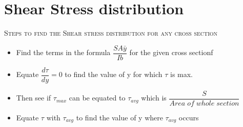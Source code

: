 \documentclass[8pt]{report}
\begin{document}
	\section{Shear Stress distribution}
	\textsc{Steps to find the Shear stress distribution for any cross section}
		\begin{itemize}
			\item Find the terms in the formula $\boxed{\dfrac{SA\bar{y}}{Ib}}$ for the given cross sectionf
			\item Equate $\dfrac{d\tau}{dy}=0$ to find the value of y for which $\tau$ is max.
			\item Then see if $\tau_{max}$ can be equated to $\tau_{avg}$ which is $\dfrac{S}{Area\;of\;whole\;section}$
			\item Equate $\tau$ with $\tau_{avg}$ to find the value of y where $\tau_{avg}$ occurs				
		\end{itemize}\hrulefill
\end{document}
